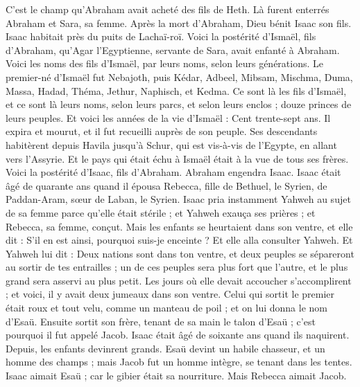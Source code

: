 \begin{multicols}{2}
C'est le champ qu'Abraham avait acheté des fils de Heth. Là furent enterrés Abraham et Sara, sa femme.
Après la mort d'Abraham, Dieu bénit Isaac son fils. Isaac habitait près du puits de Lachaï-roï.
Voici la postérité d'Ismaël, fils d'Abraham, qu'Agar l'Egyptienne, servante de Sara, avait enfanté à Abraham.
Voici les noms des fils d'Ismaël, par leurs noms, selon leurs générations. Le premier-né d'Ismaël fut Nebajoth, puis Kédar, Adbeel, Mibsam,
Mischma, Duma, Massa,
Hadad, Théma, Jethur, Naphisch, et Kedma.
Ce sont là les fils d'Ismaël, et ce sont là leurs noms, selon leurs parcs, et selon leurs enclos ; douze princes de leurs peuples.
Et voici les années de la vie d'Ismaël : Cent trente-sept ans. Il expira et mourut, et il fut recueilli auprès de son peuple.
Ses descendants habitèrent depuis Havila jusqu'à Schur, qui est vis-à-vis de l'Egypte, en allant vers l'Assyrie. Et le pays qui était échu à Ismaël était à la vue de tous ses frères.
Voici la postérité d'Isaac, fils d'Abraham.
Abraham engendra Isaac. Isaac était âgé de quarante ans quand il épousa Rebecca, fille de Bethuel, le Syrien, de Paddan-Aram, sœur de Laban, le Syrien.
Isaac pria instamment Yahweh au sujet de sa femme parce qu'elle était stérile ; et Yahweh exauça ses prières ; et Rebecca, sa femme, conçut.
Mais les enfants se heurtaient dans son ventre, et elle dit : S'il en est ainsi, pourquoi suis-je enceinte ? Et elle alla consulter Yahweh.
Et Yahweh lui dit : Deux nations sont dans ton ventre, et deux peuples se sépareront au sortir de tes entrailles ; un de ces peuples sera plus fort que l'autre, et le plus grand sera asservi au plus petit.
Les jours où elle devait accoucher s'accomplirent ; et voici, il y avait deux jumeaux dans son ventre.
Celui qui sortit le premier était roux et tout velu, comme un manteau de poil ; et on lui donna le nom d'Esaü.
Ensuite sortit son frère, tenant de sa main le talon d'Esaü ; c'est pourquoi il fut appelé Jacob. Isaac était âgé de soixante ans quand ils naquirent.
Depuis, les enfants devinrent grands. Esaü devint un habile chasseur, et un homme des champs ; mais Jacob fut un homme intègre, se tenant dans les tentes.
Isaac aimait Esaü ; car le gibier était sa nourriture. Mais Rebecca aimait Jacob.

\end{multicols}
